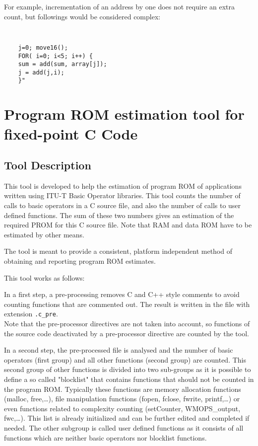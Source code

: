 For example, incrementation of an address by one does not require an
extra count, but followings would be considered complex:
{\tt\small
\begin{verbatim}
    j=0; move16();
    FOR( i=0; i<5; i++) {
    sum = add(sum, array[j]);
    j = add(j,i);
    }"
\end{verbatim}
} %

\section{Program ROM estimation tool for fixed-point C Code}

\subsection{Tool Description }
This tool is developed to help the estimation of program ROM of
applications written using ITU-T Basic Operator libraries. This tool
counts the number of calls to basic operators in a C source file, and
also the number of calls to user defined functions. The sum of these
two numbers gives an estimation of the required PROM for this C source
file. Note that RAM and data ROM have to be estimated by other means.

The tool is meant to provide a consistent, platform independent method
of obtaining and reporting program ROM estimates.

This tool works as follows:
\begin{list}{-}
    \item In a first step, a pre-processing removes C and C++ style
    comments to avoid counting functions that are commented out. The
    result is written in the file with extension {\tt .c\_pre}.\\
    Note that the pre-processor directives are not taken into account,
    so functions of the source code deactivated by a pre-processor
    directive are counted by the tool.
    \item In a second step, the pre-processed file is analysed and the
    number of basic operators (first group) and all other functions
    (second group) are counted. This second group of other functions is
    divided into two sub-groups as it is possible to define a so called
    "blocklist" that contains functions that should not be counted in
    the program ROM. Typically these functions are memory allocation
    functions (malloc, free,\dots), file manipulation functions (fopen,
    fclose, fwrite, printf,\dots) or even functions related to complexity
    counting (setCounter, WMOPS\_output, fwc,\dots). This list is
    already initialized and can be further edited and completed if
    needed. The other subgroup is called user defined functions as it
    consists of all functions which are neither basic operators nor
    blocklist functions.
\end{list}

